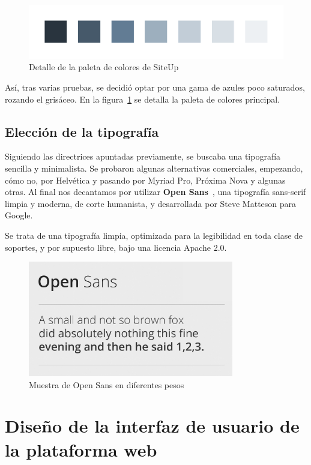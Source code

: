 \begin{figure}[H]
  \centering
  \includegraphics[width=\textwidth]{5_diseno/paleta-colores}
  \caption{Detalle de la paleta de colores de SiteUp}
  \label{fig:colores}
\end{figure}

Así, tras varias pruebas, se decidió optar por una gama de azules poco
saturados, rozando el grisáceo. En la figura~\ref{fig:colores} se detalla la
paleta de colores principal.

\subsection{Elección de la tipografía}

Siguiendo las directrices apuntadas previamente, se buscaba una tipografía
sencilla y minimalista. Se probaron algunas alternativas comerciales, empezando,
cómo no, por Helvética y pasando por Myriad Pro, Próxima Nova y algunas
otras. Al final nos decantamos por utilizar \textbf{Open Sans}~\cite{open-sans},
una tipografía sans-serif limpia y moderna, de corte humanista, y desarrollada
por Steve Matteson para Google.

Se trata de una tipografía limpia, optimizada para la legibilidad en toda clase
de soportes, y por supuesto libre, bajo una licencia Apache 2.0.

\begin{figure}[H]
  \centering
  \includegraphics[width=0.8\textwidth]{5_diseno/open-sans}
  \caption{Muestra de Open Sans en diferentes pesos}
\end{figure}

\section{Diseño de la interfaz de usuario de la plataforma web}

